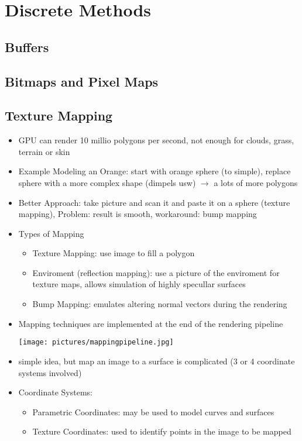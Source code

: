 \documentclass[11pt,a4paper]{article}
\begin{document}
\section{Discrete Methods}
	\subsection{Buffers}
	\subsection{Bitmaps and Pixel Maps}
	\subsection{Texture Mapping}
	\begin{itemize}
		\item GPU can render 10 millio polygons per second, not enough for clouds, grass, terrain or skin
		\item Example Modeling an Orange: start with orange sphere (to simple), replace sphere with a more complex shape (dimpels usw) $\rightarrow$ a lots of more polygons
		\item Better Approach: take picture and scan it and paste it on a sphere (texture mapping), Problem: result is smooth, workaround: bump mapping
		\item Types of Mapping
			\begin{itemize}
				\item Texture Mapping: use image to fill a polygon
				\item Enviroment (reflection mapping): use a picture of the enviroment for texture maps, allows simulation of highly specullar surfaces
				\item Bump Mapping: emulates altering normal vectors during the rendering
			\end{itemize}
		\item Mapping techniques are implemented at the end of the rendering pipeline
		\begin{center}
			\texttt{[image: pictures/mappingpipeline.jpg]}
		\end{center}
		\item simple idea, but map an image to a surface is complicated (3 or 4 coordinate systems involved)
		\item Coordinate Systems:
			\begin{itemize}
				\item Parametric Coordinates: may be used to model curves and surfaces
				\item Texture Coordinates: used to identify points in the image to be mapped

\end{itemize}
\end{itemize}
\end{document}
